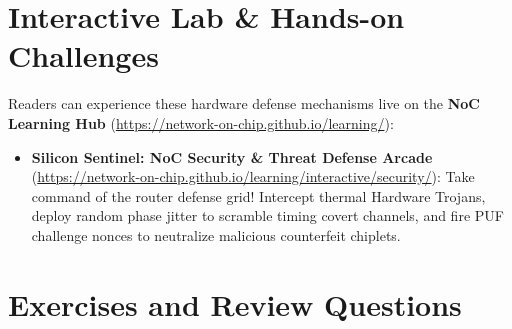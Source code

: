 \section{Interactive Lab \& Hands-on Challenges}
\label{sec:ch11_interactive}

Readers can experience these hardware defense mechanisms live on the \textbf{NoC Learning Hub} (\url{https://network-on-chip.github.io/learning/}):
\begin{itemize}
    \item \textbf{Silicon Sentinel: NoC Security \& Threat Defense Arcade} (\url{https://network-on-chip.github.io/learning/interactive/security/}): Take command of the router defense grid! Intercept thermal Hardware Trojans, deploy random phase jitter to scramble timing covert channels, and fire PUF challenge nonces to neutralize malicious counterfeit chiplets.
\end{itemize}

\section{Exercises and Review Questions}
\label{sec:ch11_exercises}

